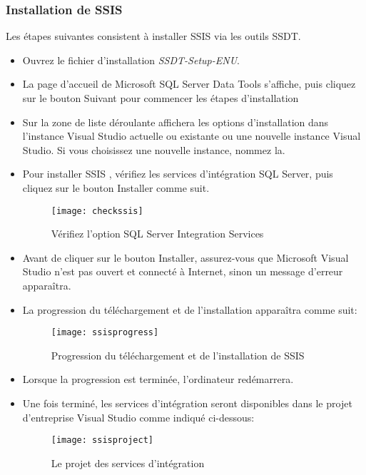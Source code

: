 \subsubsection{Installation de SSIS}
Les étapes suivantes consistent à installer SSIS via les outils SSDT. 
\begin{itemize}
    \item Ouvrez le fichier d'installation \textit{SSDT-Setup-ENU}.
    \item La page d'accueil de Microsoft SQL Server Data Tools s'affiche, puis cliquez sur le bouton Suivant pour commencer les étapes d'installation
    \item Sur la zone de liste déroulante affichera les options d'installation dans l'instance Visual Studio actuelle ou existante ou une nouvelle instance Visual Studio. Si vous choisissez une nouvelle instance, nommez la.
    \item Pour installer SSIS , vérifiez les services d'intégration SQL Server, puis cliquez sur le bouton Installer comme suit.
    \begin{figure}[H]
        \centering
        \texttt{[image: checkssis]}
        \caption{Vérifiez l'option SQL Server Integration Services}
        \label{fig:checkssis}
    \end{figure}
    \item  Avant de cliquer sur le bouton Installer, assurez-vous que Microsoft Visual Studio n'est pas ouvert et connecté à Internet, sinon un message d'erreur apparaîtra.
    \item La progression du téléchargement et de l'installation apparaîtra comme suit:
    
    \begin{figure}[H]
        \centering
        \texttt{[image: ssisprogress]}
        \caption{Progression du téléchargement et de l'installation de SSIS}
        \label{fig:ssisprogress}
    \end{figure}
    \item Lorsque la progression est terminée, l'ordinateur redémarrera.
    \item Une fois terminé, les services d'intégration seront disponibles dans le projet d'entreprise Visual Studio comme indiqué ci-dessous: 
    \begin{figure}[H]
        \centering
        \texttt{[image: ssisproject]}
        \caption{Le projet des services d'intégration}
        \label{fig:ssisproject}
    \end{figure}
\end{itemize} 

